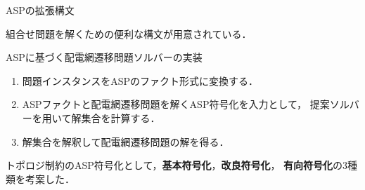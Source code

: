 \documentclass[dvipdfmx,11pt]{beamer}
\newcommand{\code}[1]{\lstinline[basicstyle=\ttfamily]{#1}}
\begin{document}
\begin{frame}{ASPの拡張構文}
\begin{alertblock}{}\centering
  組合せ問題を解くための便利な構文が用意されている．
\end{alertblock}
\end{frame}
\begin{frame}{ASPに基づく配電網遷移問題ソルバーの実装}
 \centering
 \scalebox{0.6}{\hspace{-1zw}}
 \vfill
 \begin{enumerate}
  \item 問題インスタンスをASPのファクト形式に変換する．
  \item ASPファクトと配電網遷移問題を解くASP符号化を入力として，
        提案ソルバーを用いて解集合を計算する．
  \item 解集合を解釈して配電網遷移問題の解を得る．
 \end{enumerate}\vfill
 \begin{alertblock}{}
  トポロジ制約のASP符号化として，\textbf{基本符号化}，\textbf{改良符号化}，
  \alert{\bf 有向符号化}の3種類を考案した．
 \end{alertblock}
\end{frame}
\end{document}
